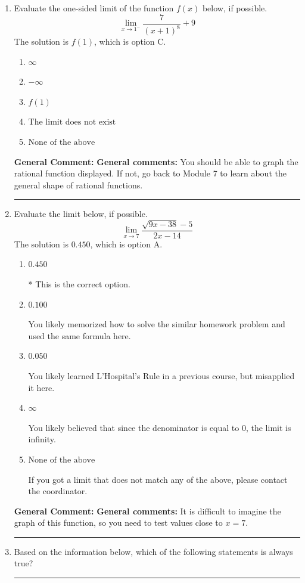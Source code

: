 \documentclass{extbook}[14pt]
\newcommand{\litem}[1]{\item #1

\rule{\textwidth}{0.4pt}}
\begin{document}
\begin{enumerate}\litem{
Evaluate the one-sided limit of the function $f(x)$ below, if possible.
\[ \lim_{x \rightarrow 1^-} \frac{7}{(x+1)^8}+9 \]The solution is \( f(1) \), which is option C.\begin{enumerate}[label=\Alph*.]
\item \( \infty \)


\item \( -\infty \)


\item \( f(1) \)


\item \( \text{The limit does not exist} \)


\item \( \text{None of the above} \)


\end{enumerate}

\textbf{General Comment:} \textbf{General comments:} You should be able to graph the rational function displayed. If not, go back to Module 7 to learn about the general shape of rational functions.
}
\litem{
Evaluate the limit below, if possible.
\[ \lim_{x \rightarrow 7} \frac{\sqrt{9x - 38} - 5}{2x - 14} \]The solution is \( 0.450 \), which is option A.\begin{enumerate}[label=\Alph*.]
\item \( 0.450 \)

* This is the correct option.
\item \( 0.100 \)

You likely memorized how to solve the similar homework problem and used the same formula here.
\item \( 0.050 \)

You likely learned L'Hospital's Rule in a previous course, but misapplied it here.
\item \( \infty \)

You likely believed that since the denominator is equal to 0, the limit is infinity.
\item \( \text{None of the above} \)

If you got a limit that does not match any of the above, please contact the coordinator.
\end{enumerate}

\textbf{General Comment:} \textbf{General comments:} It is difficult to imagine the graph of this function, so you need to test values close to $x = 7$.
}
\litem{
Based on the information below, which of the following statements is always true?

}
\end{enumerate}
\end{document}
